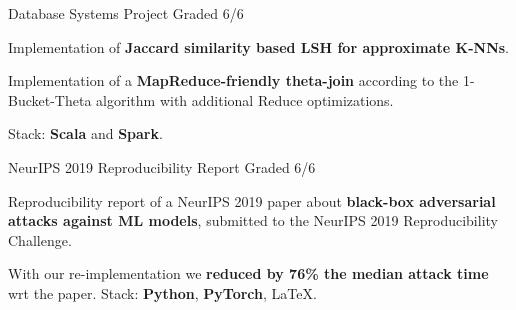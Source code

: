 

\begin{cventries}

  \cventry
    {Database Systems Project} %
    {} %
    {} %
    {Graded 6/6} %
    {
      \begin{cvitems} %
        \item Implementation of \textbf{Jaccard similarity based LSH for approximate K-NNs}.
        \item Implementation of a \textbf{MapReduce-friendly theta-join} according to the 1-Bucket-Theta algorithm with additional Reduce optimizations.
        \item Stack: \textbf{Scala} and \textbf{Spark}.
      \end{cvitems}
    }

  \cventry
    {NeurIPS 2019 Reproducibility Report} %
    {} %
    {} %
    {Graded 6/6} %
    {
      \begin{cvitems} %
        \item Reproducibility report of a NeurIPS 2019 paper about \textbf{black-box adversarial attacks against ML models}, submitted to the NeurIPS 2019 Reproducibility Challenge.
        \item With our re-implementation we \textbf{reduced by 76\% the median attack time} wrt the paper. Stack: \textbf{Python}, \textbf{PyTorch}, \LaTeX.
      \end{cvitems}
    }

\end{cventries}
